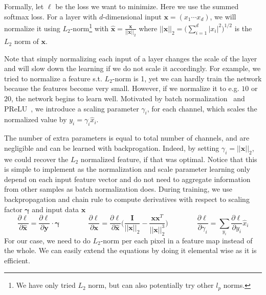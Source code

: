 \documentclass{article} %
\begin{document}
Formally, let $\ell$ be the loss we want to minimize. Here we use the summed softmax loss. For a layer with $d$-dimensional input $\mathbf{x} = (x_1\cdots x_d)$, we will normalize it using $L_2$-norm\footnote{We have only tried $L_2$ norm, but can also potentially try other $l_p$ norms.} with $\hat{\mathbf{x}} = \frac{\mathbf{x}}{||\mathbf{x}||_2}$ where $||\mathbf{x}||_2 = \Big(\sum_{i=1}^d |x_i|^2\Big)^{1/2}$ is the $L_2$ norm of $\mathbf{x}$.

Note that simply normalizing each input of a layer changes the scale of the layer and will slow down the learning if we do not scale it accordingly. For example, we tried to normalize a feature s.t. $L_2$-norm is 1, yet we can hardly train the network because the features become very small. However, if we normalize it to e.g. $10$ or $20$, the network begins to learn well. Motivated by batch normalization~\cite{ioffe2015batch} and PReLU~\cite{he2015delving}, we introduce a scaling parameter $\gamma_i$, for each channel, which scales the normalized value by $y_i = \gamma_i \hat{x}_i$.

The number of extra parameters is equal to total number of channels, and are negligible and can be learned with backprogation. Indeed, by setting $\gamma_i = ||\mathbf{x}||_2$, we could recover the $L_2$ normalized feature, if that was optimal. Notice that this is simple to implement as the normalization and scale parameter learning only depend on each input feature vector and do not need to aggregate information from other samples as batch normalization does. During training, we use backpropagation and chain rule to compute derivatives with respect to scaling factor $\mathbf{\gamma}$ and input data $\mathbf{x}$
\begin{equation}
	\frac{\partial \ell}{\partial \hat{\mathbf{x}}} = \frac{\partial \ell}{\partial \mathbf{y}} \cdot \mathbf{\gamma}\qquad\qquad
	\frac{\partial \ell}{\partial \mathbf{x}} = \frac{\partial \ell}{\partial \hat{\mathbf{x}}} \Big(\frac{\mathbf{I}}{||\mathbf{x}||_2} - \frac{\mathbf{x}\mathbf{x}^T}{||\mathbf{x}||_2^3}\Big)\qquad\qquad
	\frac{\partial \ell}{\partial \gamma_i} = \sum_{y_i} \frac{\partial \ell}{\partial y_i} \hat{x}_i
\end{equation}
For our case, we need to do $L_2$-norm per each pixel in a feature map instead of the whole. We can easily extend the equations by doing it elemental wise as it is efficient.

\end{document}
